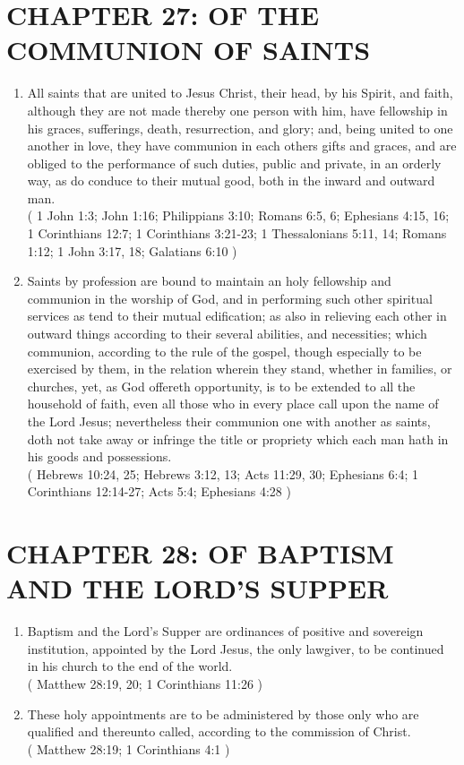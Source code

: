 \documentclass[12pt,a4paper]{book}
\begin{document}
\chapter{CHAPTER 27: OF THE COMMUNION OF SAINTS}
\label{ch-com-sai}
\begin{enumerate}
\item All saints that are united to Jesus Christ, their head, by his Spirit, and faith, although they are not made thereby one person with him, have fellowship in his graces, sufferings, death, resurrection, and glory; and, being united to one another in love, they have communion in each others gifts and graces, and are obliged to the performance of such duties, public and private, in an orderly way, as do conduce to their mutual good, both in the inward and outward man.\\
( 1 John 1:3; John 1:16; Philippians 3:10; Romans 6:5, 6; Ephesians 4:15, 16; 1 Corinthians 12:7; 1 Corinthians 3:21-23; 1 Thessalonians 5:11, 14; Romans 1:12; 1 John 3:17, 18; Galatians 6:10 )
\item Saints by profession are bound to maintain an holy fellowship and communion in the worship of God, and in performing such other spiritual services as tend to their mutual edification; as also in relieving each other in outward things according to their several abilities, and necessities; which communion, according to the rule of the gospel, though especially to be exercised by them, in the relation wherein they stand, whether in families, or churches, yet, as God offereth opportunity, is to be extended to all the household of faith, even all those who in every place call upon the name of the Lord Jesus; nevertheless their communion one with another as saints, doth not take away or infringe the title or propriety which each man hath in his goods and possessions.\\
( Hebrews 10:24, 25; Hebrews 3:12, 13; Acts 11:29, 30; Ephesians 6:4; 1 Corinthians 12:14-27; Acts 5:4; Ephesians 4:28 )
\end{enumerate}

\chapter{CHAPTER 28: OF BAPTISM AND THE LORD'S SUPPER}
\label{ch-ords}
\begin{enumerate}
\item Baptism and the Lord's Supper are ordinances of positive and sovereign institution, appointed by the Lord Jesus, the only lawgiver, to be continued in his church to the end of the world.\\
( Matthew 28:19, 20; 1 Corinthians 11:26 )
\item These holy appointments are to be administered by those only who are qualified and thereunto called, according to the commission of Christ.\\
( Matthew 28:19; 1 Corinthians 4:1 )
\end{enumerate}
\end{document}
